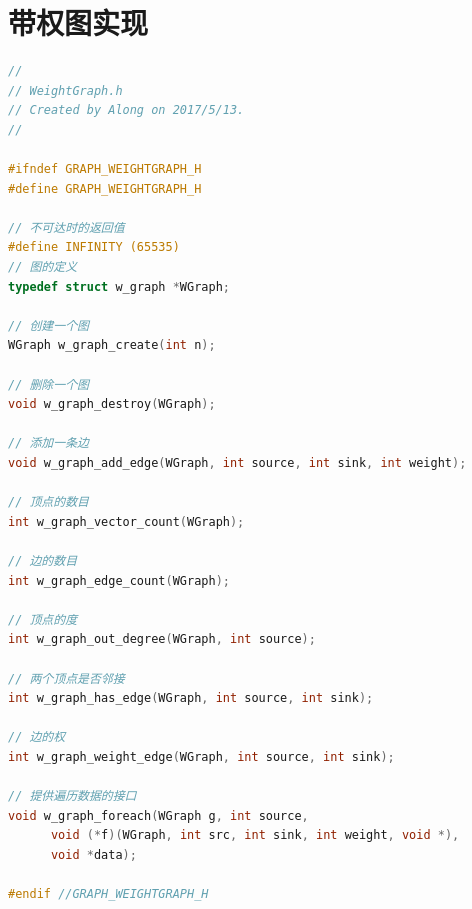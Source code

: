 \documentclass[a4paper,10pt]{ctexart}
\begin{document}
\section{带权图实现}
\begin{lstlisting}[language={C}]
//
// WeightGraph.h
// Created by Along on 2017/5/13.
//

#ifndef GRAPH_WEIGHTGRAPH_H
#define GRAPH_WEIGHTGRAPH_H

// 不可达时的返回值
#define INFINITY (65535)
// 图的定义
typedef struct w_graph *WGraph;

// 创建一个图
WGraph w_graph_create(int n);

// 删除一个图
void w_graph_destroy(WGraph);

// 添加一条边
void w_graph_add_edge(WGraph, int source, int sink, int weight);

// 顶点的数目
int w_graph_vector_count(WGraph);

// 边的数目
int w_graph_edge_count(WGraph);

// 顶点的度
int w_graph_out_degree(WGraph, int source);

// 两个顶点是否邻接
int w_graph_has_edge(WGraph, int source, int sink);

// 边的权
int w_graph_weight_edge(WGraph, int source, int sink);

// 提供遍历数据的接口
void w_graph_foreach(WGraph g, int source,
      void (*f)(WGraph, int src, int sink, int weight, void *),
      void *data);

#endif //GRAPH_WEIGHTGRAPH_H
\end{lstlisting}
\end{document}
